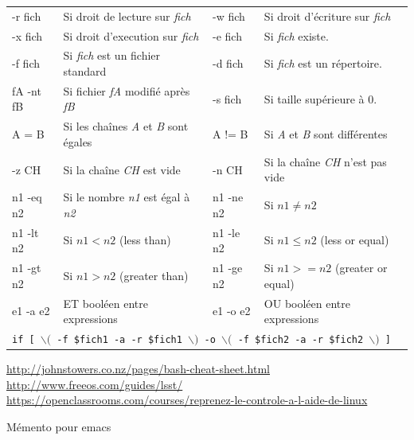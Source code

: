 \documentclass[a4paper,10pt,landscape,twocolumn]{article}
\newcommand{\Subsection}[1]{{\textbf{#1}}}
\begin{document}
\begin{tabular}{|p{13mm}|p{48mm}|p{13mm}|p{48mm}|}\hline
-r fich & Si droit de lecture sur \textit{fich} &
-w fich & Si droit d'écriture sur \textit{fich}\\
-x fich & Si droit d'execution sur \textit{fich} &
-e fich & Si \textit{fich} existe.\\
-f fich & Si \textit{fich} est un fichier standard&
-d fich & Si \textit{fich} est un répertoire.\\
{\small fA -nt fB} & Si fichier \textit{fA} modifié après \textit{fB}&
-s fich & Si taille supérieure à 0.\\\hline

A = B  & Si les chaînes \textit{A} et \textit{B} sont égales & 
A != B & Si \textit{A} et \textit{B} sont différentes \\
-z CH & Si la chaîne \textit{CH} est vide & -n CH & Si la chaîne \textit{CH} n'est pas vide\\\hline

{\small n1 -eq n2} & Si le nombre \textit{n1} est égal à \textit{n2}&
{\small n1 -ne n2} & Si $n1 \ne n2$\\
{\small n1 -lt n2} & Si $n1 < n2$ (less than)& 
{\small n1 -le n2} & Si $n1 \le n2$ (less or equal)\\
{\small n1 -gt n2} & Si $n1 > n2$ (greater than)&
{\small n1 -ge n2} & Si $n1 >= n2$ (greater or equal)\\\hline
{\small e1 -a e2}  & ET booléen entre expressions& 
{\small e1 -o e2}  & OU booléen entre expressions\\\hline

\multicolumn{4}{|l|}{\texttt{if [ $\backslash($ -f \$fich1 -a -r \$fich1 $\backslash)$ -o  $\backslash($ -f \$fich2 -a -r \$fich2 $\backslash)$ ] }}\\\hline
\end{tabular}

\url{http://johnstowers.co.nz/pages/bash-cheat-sheet.html}\\
\url{http://www.freeos.com/guides/lsst/}\\
\url{https://openclassrooms.com/courses/reprenez-le-controle-a-l-aide-de-linux}
\newpage
\twocolumn[]
\null\bigskip\centerline{\Huge Mémento pour emacs}
\medskip


\end{document}
